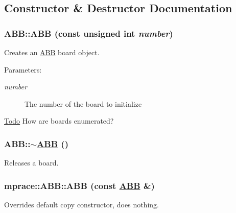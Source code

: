 \subsection{Constructor \& Destructor Documentation}
\hypertarget{classmprace_1_1ABB_a0}{
\subsubsection[ABB]{\setlength{\rightskip}{0pt plus 5cm}ABB::ABB (const unsigned int {\em number})}}
\label{classmprace_1_1ABB_a0}


Creates an \hyperlink{classmprace_1_1ABB}{ABB} board object. 

\begin{Desc}
\item[Parameters:]
\begin{description}
\item[{\em number}]The number of the board to initialize \end{description}
\end{Desc}
\begin{Desc}
\item[\hyperlink{todo__todo000001}{Todo}]How are boards enumerated? \end{Desc}
\hypertarget{classmprace_1_1ABB_a1}{
\subsubsection[$\sim$ABB]{\setlength{\rightskip}{0pt plus 5cm}ABB::$\sim$\hyperlink{classmprace_1_1ABB}{ABB} ()}}
\label{classmprace_1_1ABB_a1}


Releases a board. 

\hypertarget{classmprace_1_1ABB_b0}{
\subsubsection[ABB]{\setlength{\rightskip}{0pt plus 5cm}mprace::ABB::ABB (const \hyperlink{classmprace_1_1ABB}{ABB} \&)}}
\label{classmprace_1_1ABB_b0}


Overrides default copy constructor, does nothing. 



